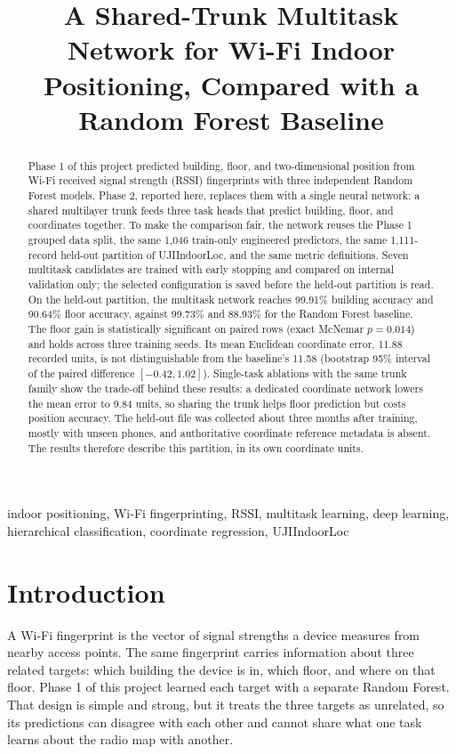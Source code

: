 \documentclass[conference]{IEEEtran}
\title{A Shared-Trunk Multitask Network for Wi-Fi Indoor Positioning, Compared with a Random Forest Baseline}
\author{}
\date{}
\begin{document}
\maketitle
\begin{abstract}
Phase 1 of this project predicted building, floor, and two-dimensional position from Wi-Fi received signal strength (RSSI) fingerprints with three independent Random Forest models. Phase 2, reported here, replaces them with a single neural network: a shared multilayer trunk feeds three task heads that predict building, floor, and coordinates together. To make the comparison fair, the network reuses the Phase 1 grouped data split, the same 1,046 train-only engineered predictors, the same 1,111-record held-out partition of UJIIndoorLoc, and the same metric definitions. Seven multitask candidates are trained with early stopping and compared on internal validation only; the selected configuration is saved before the held-out partition is read. On the held-out partition, the multitask network reaches 99.91\% building accuracy and 90.64\% floor accuracy, against 99.73\% and 88.93\% for the Random Forest baseline. The floor gain is statistically significant on paired rows (exact McNemar $p=0.014$) and holds across three training seeds. Its mean Euclidean coordinate error, 11.88 recorded units, is not distinguishable from the baseline's 11.58 (bootstrap 95\% interval of the paired difference $[-0.42, 1.02]$). Single-task ablations with the same trunk family show the trade-off behind these results: a dedicated coordinate network lowers the mean error to 9.84 units, so sharing the trunk helps floor prediction but costs position accuracy. The held-out file was collected about three months after training, mostly with unseen phones, and authoritative coordinate reference metadata is absent. The results therefore describe this partition, in its own coordinate units.
\end{abstract}
\begin{IEEEkeywords}
indoor positioning, Wi-Fi fingerprinting, RSSI, multitask learning, deep learning, hierarchical classification, coordinate regression, UJIIndoorLoc
\end{IEEEkeywords}

\section{Introduction}
A Wi-Fi fingerprint is the vector of signal strengths a device measures from nearby access points. The same fingerprint carries information about three related targets: which building the device is in, which floor, and where on that floor. Phase 1 of this project learned each target with a separate Random Forest. That design is simple and strong, but it treats the three targets as unrelated, so its predictions can disagree with each other and cannot share what one task learns about the radio map with another.
\end{document}
